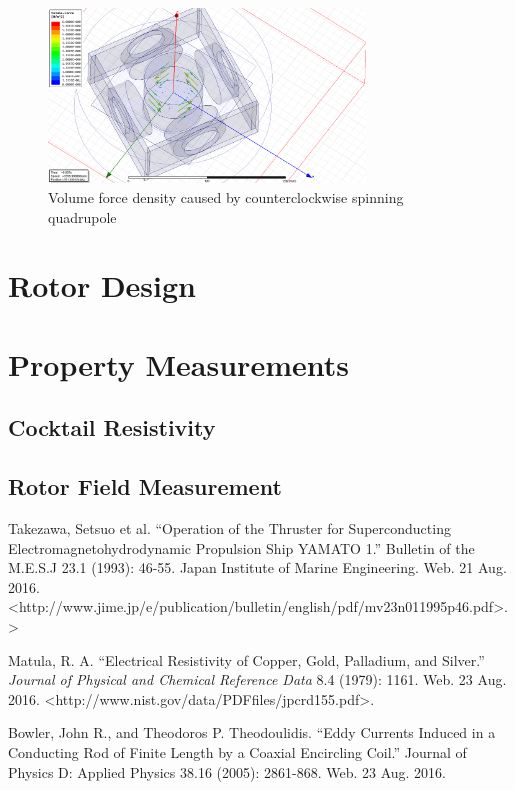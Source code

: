 \documentclass[]{article}
\begin{document}
\begin{figure}[h!]
	\centering
	\includegraphics[width=0.75\textwidth]{VolumeForceDensityStill}
	\caption{Volume force density caused by counterclockwise spinning quadrupole}
	\label{fig:volume_force_density}
\end{figure}

\section{Rotor Design}

\section{Property Measurements}
\subsection{Cocktail Resistivity}
\label{sec:resistivity}
\subsection{Rotor Field Measurement}



\begin{thebibliography}{3}
	Takezawa, Setsuo et al. ``Operation of the Thruster for Superconducting Electromagnetohydrodynamic Propulsion Ship YAMATO 1.'' Bulletin of the M.E.S.J 23.1 (1993): 46-55. Japan Institute of Marine Engineering. Web. 21 Aug. 2016. \textless http://www.jime.jp/e/publication/bulletin/english/pdf/mv23n011995p46.pdf>.\textgreater
	
	Matula, R. A. ``Electrical Resistivity of Copper, Gold, Palladium, and Silver.'' \textit{Journal of Physical and Chemical Reference Data} 8.4 (1979): 1161. Web. 23 Aug. 2016. \textless http://www.nist.gov/data/PDFfiles/jpcrd155.pdf\textgreater. 
	
	Bowler, John R., and Theodoros P. Theodoulidis. ``Eddy Currents Induced in a Conducting Rod of Finite Length by a Coaxial Encircling Coil.'' Journal of Physics D: Applied Physics 38.16 (2005): 2861-868. Web. 23 Aug. 2016. 
\end{thebibliography}
\end{document}
